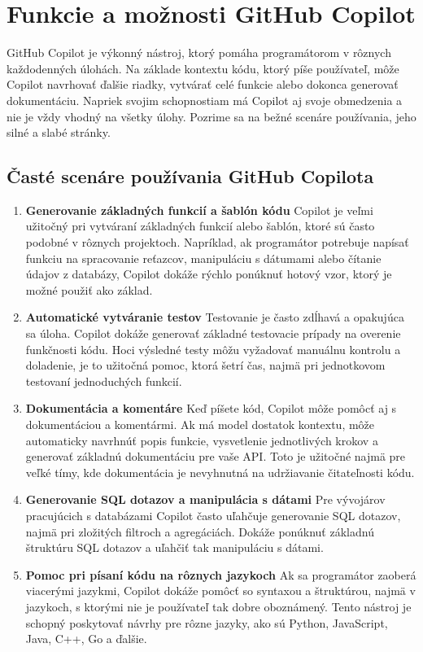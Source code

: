 \documentclass[10pt,oneside,slovak,a4paper, onecolumn]{article}
\begin{document}
\section{Funkcie a možnosti GitHub Copilot}
GitHub Copilot je výkonný nástroj, ktorý pomáha programátorom v rôznych každodenných úlohách. Na základe kontextu kódu, ktorý píše používateľ, môže Copilot navrhovať ďalšie riadky, vytvárať celé funkcie alebo dokonca generovať dokumentáciu. Napriek svojim schopnostiam má Copilot aj svoje obmedzenia a nie je vždy vhodný na všetky úlohy. Pozrime sa na bežné scenáre používania, jeho silné a slabé stránky.

\subsection{Časté scenáre používania GitHub Copilota}
\begin{enumerate}
    \item \textbf{Generovanie základných funkcií a šablón kódu}
    Copilot je veľmi užitočný pri vytváraní základných funkcií alebo šablón, ktoré sú často podobné v rôznych projektoch. Napríklad, ak programátor potrebuje napísať funkciu na spracovanie reťazcov, manipuláciu s dátumami alebo čítanie údajov z databázy, Copilot dokáže rýchlo ponúknuť hotový vzor, ktorý je možné použiť ako základ.
    \item \textbf{Automatické vytváranie testov}
    Testovanie je často zdĺhavá a opakujúca sa úloha. Copilot dokáže generovať základné testovacie prípady na overenie funkčnosti kódu. Hoci výsledné testy môžu vyžadovať manuálnu kontrolu a doladenie, je to užitočná pomoc, ktorá šetrí čas, najmä pri jednotkovom testovaní jednoduchých funkcií. \cite{bito}
    \item \textbf{Dokumentácia a komentáre}
    Keď píšete kód, Copilot môže pomôcť aj s dokumentáciou a komentármi. Ak má model dostatok kontextu, môže automaticky navrhnúť popis funkcie, vysvetlenie jednotlivých krokov a generovať základnú dokumentáciu pre vaše API. Toto je užitočné najmä pre veľké tímy, kde dokumentácia je nevyhnutná na udržiavanie čitateľnosti kódu.
    \item \textbf{Generovanie SQL dotazov a manipulácia s dátami}
    Pre vývojárov pracujúcich s databázami Copilot často uľahčuje generovanie SQL dotazov, najmä pri zložitých filtroch a agregáciách. Dokáže ponúknuť základnú štruktúru SQL dotazov a uľahčiť tak manipuláciu s dátami.
    \item \textbf{Pomoc pri písaní kódu na rôznych jazykoch}
    Ak sa programátor zaoberá viacerými jazykmi, Copilot dokáže pomôcť so syntaxou a štruktúrou, najmä v jazykoch, s ktorými nie je používateľ tak dobre oboznámený. Tento nástroj je schopný poskytovať návrhy pre rôzne jazyky, ako sú Python, JavaScript, Java, C++, Go a ďalšie.\cite{bito}
\end{enumerate}
\end{document}
